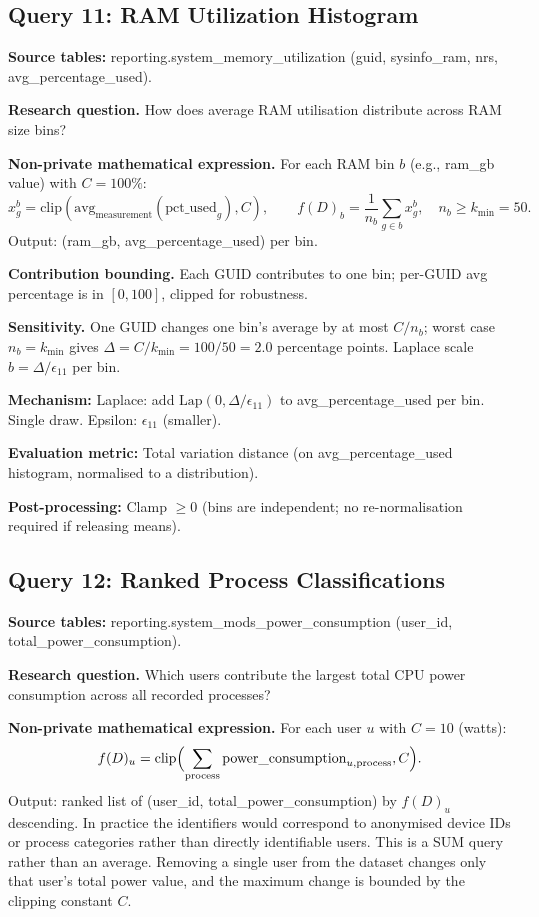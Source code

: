 \documentclass[12pt,letterpaper]{article}
\begin{document}
\subsection{Query 11: RAM Utilization Histogram}
\label{sec:q11}

\textbf{Source tables:} reporting.system\_memory\_utilization (guid, sysinfo\_ram, nrs, avg\_percentage\_used).

\textbf{Research question.} How does average RAM utilisation distribute across RAM size bins?

\textbf{Non-private mathematical expression.} For each RAM bin $b$ (e.g., ram\_gb value) with $C = 100\%$:
\[
x_g^b = \text{clip}(\text{avg}_{\text{measurement}}(\text{pct\_used}_g), C), \qquad
f(D)_b = \frac{1}{n_b} \sum_{g \in b} x_g^b, \quad n_b \geq k_{\min} = 50.
\]
Output: (ram\_gb, avg\_percentage\_used) per bin.

\textbf{Contribution bounding.} Each GUID contributes to one bin; per-GUID avg percentage is in $[0,100]$, clipped for robustness.

\textbf{Sensitivity.} One GUID changes one bin's average by at most $C/n_b$; worst case $n_b = k_{\min}$ gives $\Delta = C/k_{\min} = 100/50 = 2.0$ percentage points. Laplace scale $b = \Delta/\epsilon_{11}$ per bin.

\textbf{Mechanism:} Laplace: add $\text{Lap}(0, \Delta/\epsilon_{11})$ to avg\_percentage\_used per bin. Single draw. Epsilon: $\epsilon_{11}$ (smaller).

\textbf{Evaluation metric:} Total variation distance (on avg\_percentage\_used histogram, normalised to a distribution).

\textbf{Post-processing:} Clamp $\geq 0$ (bins are independent; no re-normalisation required if releasing means).

\subsection{Query 12: Ranked Process Classifications}
\label{sec:q12}

\textbf{Source tables:} reporting.system\_mods\_power\_consumption (user\_id, total\_power\_consumption).

\textbf{Research question.} Which users contribute the largest total CPU power consumption across all recorded processes?

\textbf{Non-private mathematical expression.} For each user $u$ with $C = 10$ (watts):
\[
f(D)_u = \text{clip}\Bigl(\sum_{\text{process}} \text{power\_consumption}_{u,\text{process}}, C\Bigr).
\]
Output: ranked list of (user\_id, total\_power\_consumption) by $f(D)_u$ descending. In practice the identifiers would correspond to anonymised device IDs or process categories rather than directly identifiable users. This is a SUM query rather than an average. Removing a single user from the dataset changes only that user's total power value, and the maximum change is bounded by the clipping constant $C$.
\end{document}
